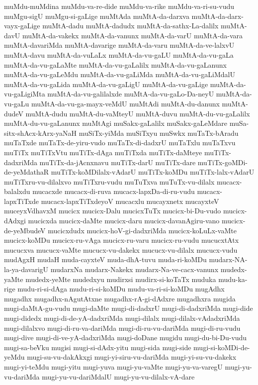 {muMdu-muMdina
muMdu-va-re-dide
muMdu-va-rike
muMdu-va-ri-su-vudu
muMgu-sigU
muMgu-si-gaLige
muMtAda
muMtA-da-darxva
muMtA-da-darx-vayx-gaLige
muMtA-dadu
muMtA-dadudx
muMtA-da-sathx-La-dalilx
muMtA-davU
muMtA-da-vakekx
muMtA-da-vanunx
muMtA-da-varU
muMtA-da-vara
muMtA-davariMda
muMtA-davarige
muMtA-da-varu
muMtA-da-ve-lalxvU
muMtA-davu
muMtA-da-vuLaLx
muMtA-da-vu-gaLU
muMtA-da-vu-gaLa
muMtA-da-vu-gaLaMte
muMtA-da-vu-gaLalilx
muMtA-da-vu-gaLanunx
muMtA-da-vu-gaLeMdu
muMtA-da-vu-gaLiMda
muMtA-da-vu-gaLiMdalU
muMtA-da-vu-gaLida
muMtA-da-vu-gaLigU
muMtA-da-vu-gaLige
muMtA-da-vu-gaLigiMta
muMtA-da-vu-galilalxde
muMtA-da-vu-gaLo-Da-neyU
muMtA-da-vu-gaLu
muMtA-da-vu-ga-mayx-veMdU
muMtAdi
muMtA-du-danunx
muMtA-dudeV
muMtA-dudu
muMtA-du-vaMteyU
muMtA-duvu
muMtA-du-vu-gaLalilx
muMtA-du-vu-gaLanunx
muMtAgi
muSakx-gaLalilx
muSakx-gaLeMdare
muSa-sitx-shAcx-kArx-yaNaH
muSiTx-yiMda
muSiTxyu
muSwkx
muTaTx-bAradu
muTaTxde
muTaTx-de-yiru-vudo
muTaTx-di-dadxrU
muTaTxlu
muTaTxvu
muTiTx
muTiTxVtu
muTiTx-dAga
muTiTxda
muTiTx-daMteye
muTiTx-dadxriMda
muTiTx-da-jAcnxnavu
muTiTx-darU
muTiTx-dare
muTiTx-goMDi-de-yeMdathaR
muTiTx-koMDilalx-vAdarU
muTiTx-koMDu
muTiTx-lalx-vAdarU
muTiTxru-vu-dilalxvo
muTiTxru-vudu
muTuTxva
muTuTx-vu-dilalx
mucacx-balalxdu
mucacxde
mucacx-di-ruva
mucacx-lapxDa-di-ru-vudu
mucacx-lapxTiTxde
mucacx-lapxTiTxdeyoV
mucacxlu
mucayxnetx
mucayxteV
muceyxVdhavxM
mucicx
mucicx-Dalu
mucicxTuTx
mucicx-bi-Du-vudo
mucicx-dAdxgi
mucicxda
mucicx-daMte
mucicx-daru
mucicx-davanAgiru-vano
mucicx-de-yeMbudeV
mucicxdudx
mucicx-hoV-gi-dadxriMda
mucicx-koLuLx-vaMte
mucicx-koMDu
mucicx-ru-vAga
mucicx-ru-varu
mucicx-ru-vudu
mucucxtAtx
mucucxva
mucucx-vaMte
mucucx-vu-dakekx
mucucx-vu-dilalx
mucucx-vudu
mudAgxH
mudaH
muda-cayxteV
muda-dhA-tuvu
muda-ri-koMDu
mudarx-NA-la-ya-davarigU
mudarxNa
mudarx-Nakekx
mudarx-Na-ve-cacx-vanunx
mudedx-yaMte
mudedx-yeMte
mudedxyu
mudirxsi
mudirx-si-koTaTx
muduka
mudu-ka-rige
mudu-ri-si-dAga
mudu-ri-si-koMDu
mudu-va-ri-si-koMDu
mugAdhx
mugadhx
mugadhx-nAgutAtxne
mugadhx-rA-gi-dAdxre
mugadhxra
mugida
mugi-daMtA-gu-vudu
mugi-daMte
mugi-di-dadxrU
mugi-di-dadxriMda
mugi-dide
mugi-didedx
mugi-di-de-yA-dadxriMda
mugi-dilalx
mugi-dilalx-vAdadxriMda
mugi-dilalxvo
mugi-di-ru-va-dariMda
mugi-di-ru-vu-dariMda
mugi-di-ru-vudu
mugi-dive
mugi-di-ve-yA-dadxriMda
mugi-doDane
mugidu
mugi-du-bi-Du-vudu
mugi-sa-beVku
mugisi
mugi-si-dAdx-yitu
mugi-sida
mugi-side
mugi-si-koMDi-de-yeMdu
mugi-su-vu-dakAkxgi
mugi-yi-siru-vu-dariMda
mugi-yi-su-vu-dakekx
mugi-yi-teMdu
mugi-yitu
mugi-yuva
mugi-yu-vaMte
mugi-yu-va-varegU
mugi-yu-vu-dariMda
mugi-yu-vu-dariMdalU
mugi-yu-vu-dilalx-vA-dare
}

